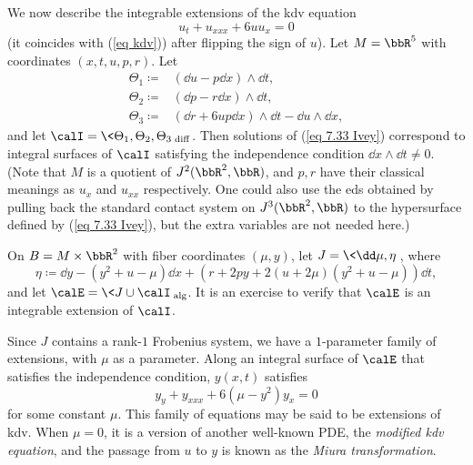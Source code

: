 \begin{example}\label{ex 7.5.6 Ivey}
    We now describe the integrable extensions of the \gls{kdv} equation 
    \[u_t+u_{xxx}+6uu_x=0\label{eq 7.33 Ivey}\]
    (it coincides with (\ref{eq kdv})) after flipping the sign of $u$). Let $M=\bbR^5$ with coordinates $(x,t,u,p,r)$. Let 
    \begin{align}
        \Theta_1\coloneqq &(\dd u-p\dd x)\wedge\dd t,\\
        \Theta_2\coloneqq &(\dd p-r\dd x)\wedge\dd t,\\
        \Theta_3\coloneqq &(\dd r+6u p\dd x)\wedge \dd t-\dd u\wedge\dd x,
    \end{align}
    and let $\calI=\<\Theta_1,\Theta_2,\Theta_3\>_{\mathrm{diff}}$. Then solutions of (\ref{eq 7.33 Ivey}) correspond to integral surfaces of $\calI$ satisfying the independence condition $\dd x\wedge\dd t\neq 0$. (Note that $M$ is a quotient of $J^2(\bbR^2,\bbR)$, and $p,r$ have their classical meanings as $u_x$ and $u_{xx}$ respectively. One could also use the \gls{eds} obtained by pulling back the standard contact system on $J^3(\bbR^2,\bbR)$ to the hypersurface defined by (\ref{eq 7.33 Ivey}), but the extra variables are not needed here.)

    On $B=M\times\bbR^2$ with fiber coordinates $(\mu,y)$, let $J=\<\dd \mu,\eta\>$, where 
    \[\eta\coloneqq \dd y-(y^2+u-\mu)\dd x+(r+2py+2(u+2\mu)(y^2+u-\mu))\dd t,\]
    and let $\calE=\<J\cup \calI\>_{\mathrm{alg}}$. It is an exercise to verify that $\calE$ is an integrable extension of $\calI$.

    Since $J$ contains a rank-$1$ Frobenius system, we have a $1$-parameter family of extensions, with $\mu$ as a parameter. Along an integral surface of $\calE$ that satisfies the independence condition, $y(x,t)$ satisfies 
    \[y_y+y_{xxx}+6(\mu-y^2)y_x=0\label{eq 7.34 Ivey}\]
    for some constant $\mu$. This family of equations may be said to be extensions of \gls{kdv}. When $\mu=0$, it is a version of another well-known PDE, the \emph{modified \gls{kdv} equation}, and the passage from $u$ to $y$ is known as the \emph{Miura transformation}.
\end{example}


